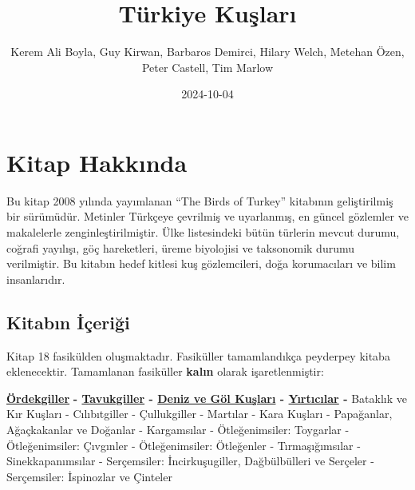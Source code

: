 \documentclass[
  letterpaper,
  DIV=11,
  numbers=noendperiod]{scrreprt}
\title{Türkiye Kuşları}
\author{Kerem Ali Boyla, Guy Kirwan, Barbaros Demirci, Hilary Welch,
Metehan Özen, Peter Castell, Tim Marlow}
\date{2024-10-04}
\renewcommand*\contentsname{Table of contents}
\newcommand\contentsname{Table of contents}
\begin{document}
\maketitle

\renewcommand*\contentsname{Table of contents}
{
\hypersetup{linkcolor=}
\setcounter{tocdepth}{2}
\tableofcontents
}


\chapter*{Kitap Hakkında}\label{kitap-hakkux131nda}


Bu kitap 2008 yılında yayımlanan ``The Birds of Turkey'' kitabının
geliştirilmiş bir sürümüdür. Metinler Türkçeye çevrilmiş ve uyarlanmış,
en güncel gözlemler ve makalelerle zenginleştirilmiştir. Ülke
listesindeki bütün türlerin mevcut durumu, coğrafi yayılışı, göç
hareketleri, üreme biyolojisi ve taksonomik durumu verilmiştir. Bu
kitabın hedef kitlesi kuş gözlemcileri, doğa korumacıları ve bilim
insanlarıdır.

\section*{Kitabın İçeriği}\label{kitabux131n-iuxe7eriux11fi}


Kitap 18 fasikülden oluşmaktadır. Fasiküller tamamlandıkça peyderpey
kitaba eklenecektir. Tamamlanan fasiküller \textbf{kalın} olarak
işaretlenmiştir:

\href{https://keremaliboyla.github.io/turkiye-kuslari/01_ordekgiller.html}{\textbf{Ördekgiller}}
\textbf{-
\href{https://keremaliboyla.github.io/turkiye-kuslari/02_tavukgiller.html}{Tavukgiller}
-
\href{https://keremaliboyla.github.io/turkiye-kuslari/03_deniz-ve-gol-kuslari.html}{Deniz
ve Göl Kuşları} -
\href{https://keremaliboyla.github.io/turkiye-kuslari/04_yirticilar.html}{Yırtıcılar}
-} Bataklık ve Kır Kuşları - Cılıbıtgiller - Çullukgiller - Martılar -
Kara Kuşları - Papağanlar, Ağaçkakanlar ve Doğanlar - Kargamsılar -
Ötleğenimsiler: Toygarlar - Ötleğenimsiler: Çıvgınler - Ötleğenimsiler:
Ötleğenler - Tırmaşığımsılar - Sinekkapanımsılar - Serçemsiler:
İncirkuşugiller, Dağbülbülleri ve Serçeler - Serçemsiler: İspinozlar ve
Çinteler
\end{document}
